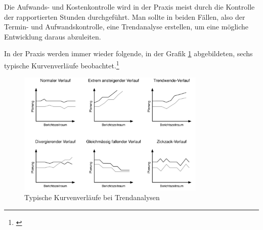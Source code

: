 Die Aufwands- und Kostenkontrolle wird in der Praxis meist durch die Kontrolle
der rapportierten Stunden durchgeführt. Man sollte in beiden Fällen, also der
Termin- und Aufwandskontrolle, eine Trendanalyse erstellen, um eine mögliche
Entwicklung daraus abzuleiten.

\clearpage

In der Praxis werden immer wieder folgende, in der Grafik \ref{pic:06_trendanalyse}
abgebildeten, sechs typische Kurvenverläufe beobachtet.\footnote{\citealp*[Vgl.][S. 177 und S. 194]{burghardt2007einfuehrung}}

\begin{figure}[htbp]
\begin{center}
\includegraphics[width=0.8\textwidth,angle=0]{./bilder/theorie/06_trendanalyse.pdf}
\caption[Typische Kurvenverläufe bei Trendanalysen]{Typische Kurvenverläufe bei Trendanalysen\footnotemark}
\label{pic:06_trendanalyse}
\end{center}
\end{figure}


